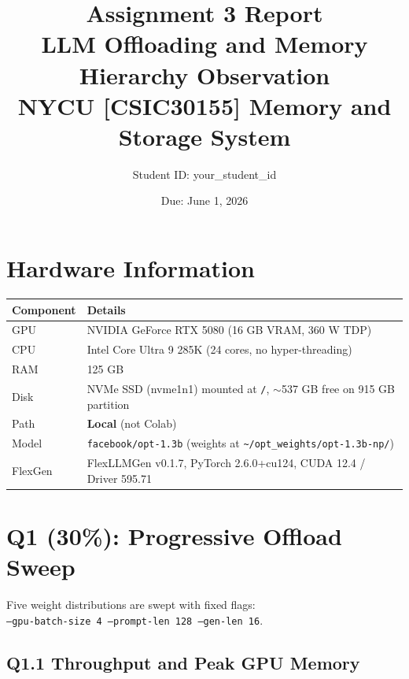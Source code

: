 \documentclass[12pt,a4paper]{article}
\title{\textbf{Assignment 3 Report}\\
\large LLM Offloading and Memory Hierarchy Observation\\
\normalsize NYCU [CSIC30155] Memory and Storage System}
\author{Student ID: your\_student\_id}
\date{Due: June 1, 2026}
\begin{document}
\maketitle

\section*{Hardware Information}

\begin{table}[H]
\centering
\begin{tabular}{lp{11cm}}
\toprule
\textbf{Component} & \textbf{Details} \\
\midrule
GPU       & NVIDIA GeForce RTX 5080 (16 GB VRAM, 360 W TDP) \\
CPU       & Intel Core Ultra 9 285K (24 cores, no hyper-threading) \\
RAM       & 125 GB \\
Disk      & NVMe SSD (nvme1n1) mounted at \texttt{/}, $\sim$537 GB free on 915 GB partition \\
Path      & \textbf{Local} (not Colab) \\
\midrule
Model     & \texttt{facebook/opt-1.3b} (weights at \texttt{\textasciitilde/opt\_weights/opt-1.3b-np/}) \\
FlexGen   & FlexLLMGen v0.1.7, PyTorch 2.6.0+cu124, CUDA 12.4 / Driver 595.71 \\
\bottomrule
\end{tabular}
\end{table}

\newpage

\section{Q1 (30\%): Progressive Offload Sweep}

Five weight distributions are swept with fixed flags:\\
\texttt{--gpu-batch-size 4 --prompt-len 128 --gen-len 16}.

\subsection*{Q1.1 Throughput and Peak GPU Memory}
\end{document}
